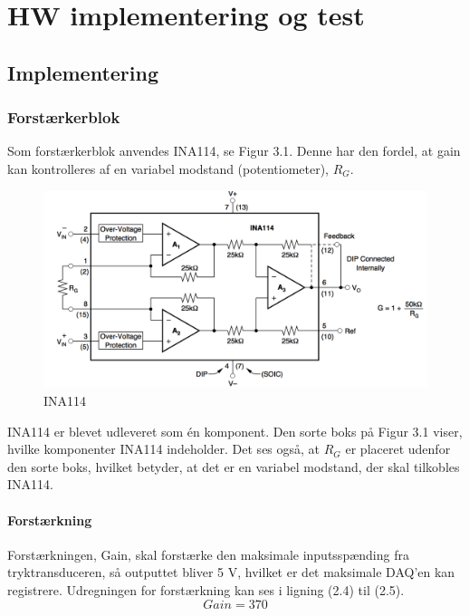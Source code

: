 \chapter{HW implementering og test}

\section{Implementering}

\subsection{Forstærkerblok}
Som forstærkerblok anvendes INA114, se Figur 3.1. Denne har den fordel, at gain kan kontrolleres af en variabel modstand (potentiometer), $R_{G}$. 

\begin{figure}[H]
	\centering
	\includegraphics[width=1\textwidth]{Figurer/Snip20151117_104}
	\caption{INA114}
\end{figure}

INA114 er blevet udleveret som én komponent. Den sorte boks på Figur 3.1 viser, hvilke komponenter INA114 indeholder. Det ses også, at $R_{G}$ er placeret udenfor den sorte boks, hvilket betyder, at det er en variabel modstand, der skal tilkobles INA114.     

\subsubsection{Forstærkning}
Forstærkningen, Gain, skal forstærke den maksimale inputsspænding fra tryktransduceren, så outputtet bliver 5 V, hvilket er det maksimale DAQ'en kan registrere. Udregningen for forstærkning kan ses i ligning (2.4) til (2.5).
\begin{equation}
	Gain = 370
\end{equation}


